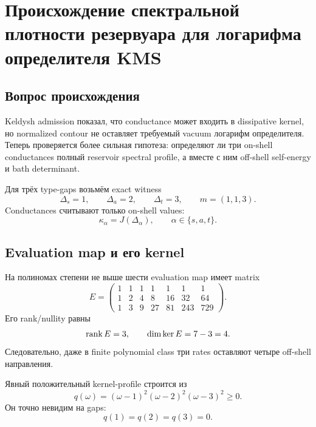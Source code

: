 \chapter{Происхождение спектральной плотности резервуара для логарифма определителя KMS}
\label{ch:v9-kms-reservoir-spectral-density-origin}

\section{Вопрос происхождения}

Keldysh admission показал, что conductance может входить в dissipative
kernel, но normalized contour не оставляет требуемый vacuum логарифм определителя. Теперь
проверяется более сильная гипотеза: определяют ли три on-shell conductances
полный reservoir spectral profile, а вместе с ним off-shell self-energy и
bath determinant.

Для трёх type-gaps возьмём exact witness
\begin{equation}
 \Delta_s=1,
 \qquad \Delta_a=2,
 \qquad \Delta_t=3,
 \qquad m=(1,1,3).
 \label{eq:v9-kms-reservoir-gaps}
\end{equation}
Conductances считывают только on-shell values:
\begin{equation}
 \kappa_\alpha=J(\Delta_\alpha),
 \qquad \alpha\in\{s,a,t\}.
 \label{eq:v9-kms-reservoir-onshell-rates}
\end{equation}

\section{Evaluation map и его kernel}

На полиномах степени не выше шести evaluation map имеет matrix
\begin{equation}
 E=\begin{pmatrix}
 1&1&1&1&1&1&1\\
 1&2&4&8&16&32&64\\
 1&3&9&27&81&243&729
 \end{pmatrix}.
 \label{eq:v9-kms-reservoir-evaluation-map}
\end{equation}
Его rank/nullity равны
\begin{equation}
 \operatorname{rank} E=3,
 \qquad \dim\ker E=7-3=4.
 \label{eq:v9-kms-reservoir-evaluation-rank}
\end{equation}
Следовательно, даже в finite polynomial class три rates оставляют четыре
off-shell направления.

Явный положительный kernel-profile строится из
\begin{equation}
 q(\omega)=
 (\omega-1)^2(\omega-2)^2(\omega-3)^2\geq0.
 \label{eq:v9-kms-reservoir-kernel-profile}
\end{equation}
Он точно невидим на gaps:
\begin{equation}
 q(1)=q(2)=q(3)=0.
 \label{eq:v9-kms-reservoir-kernel-zeros}
\end{equation}

